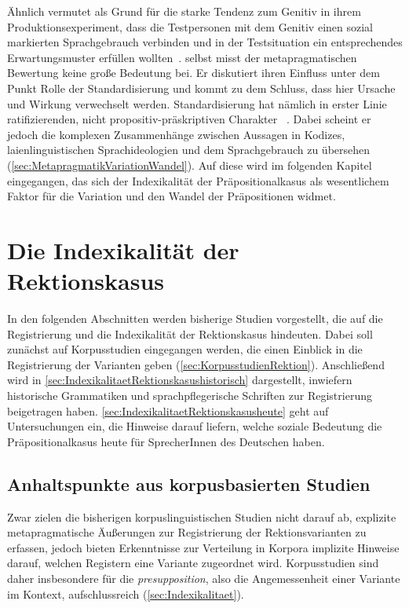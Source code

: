 Ähnlich vermutet \citeauthor{Becker2011} als Grund für die starke Tendenz zum Genitiv in ihrem Produktionsexperiment, {\glqq}dass die Testpersonen mit dem Genitiv einen sozial markierten Sprachgebrauch verbinden und in der Testsituation ein entsprechendes Erwartungsmuster erf{\"u}llen wollten{\grqq}~\citep[211]{Becker2011}. 
\citet[218]{DiMeola2000} selbst misst der metapragmatischen Bewertung keine große Bedeutung bei. 
Er diskutiert ihren Einfluss unter dem Punkt {\glqq}Rolle der Standardisierung{\grqq} und kommt zu dem Schluss, dass hier {\glqq}Ursache und Wirkung verwechselt werden. Standardisierung hat n{\"a}mlich in erster Linie ratifizierenden, nicht propositiv-pr{\"a}skriptiven Charakter{\grqq} ~\citep[216]{DiMeola2000}. 
Dabei scheint er jedoch die komplexen Zusammenhänge zwischen Aussagen in Kodizes, laienlinguistischen Sprachideologien und dem Sprachgebrauch zu übersehen (\autoref{sec:MetapragmatikVariationWandel}). 
Auf diese wird im folgenden Kapitel eingegangen, das sich der Indexikalität der Präpositionalkasus als wesentlichem Faktor für die Variation und den Wandel der Präpositionen widmet. 
\section{Die Indexikalität der Rektionskasus} \label{sec:IndexikalitaetRektionskasus}
In den folgenden Abschnitten werden bisherige Studien vorgestellt, die auf die Registrierung und die Indexikalität der Rektionskasus hindeuten. 
Dabei soll zunächst auf Korpusstudien eingegangen werden, die einen Einblick in die Registrierung der Varianten geben (\autoref{sec:KorpusstudienRektion}). 
Anschließend wird in \autoref{sec:IndexikalitaetRektionskasushistorisch} dargestellt, inwiefern historische Grammatiken und sprachpflegerische Schriften zur Registrierung beigetragen haben.  
\autoref{sec:IndexikalitaetRektionskasusheute} geht auf Untersuchungen ein, die Hinweise darauf liefern, welche soziale Bedeutung die Präpositionalkasus heute für SprecherInnen des Deutschen haben. 
\subsection{Anhaltspunkte aus korpusbasierten Studien}
\label{sec:KorpusstudienRektion}
Zwar zielen die bisherigen korpuslinguistischen Studien nicht darauf ab, explizite metapragmatische Äußerungen zur Registrierung der Rektionsvarianten zu erfassen, jedoch bieten Erkenntnisse zur Verteilung in Korpora implizite Hinweise darauf, welchen Registern eine Variante zugeordnet wird. 
Korpusstudien sind daher insbesondere für die \textit{presupposition}, also die Angemessenheit einer Variante im Kontext, aufschlussreich (\autoref{sec:Indexikalitaet}). 

